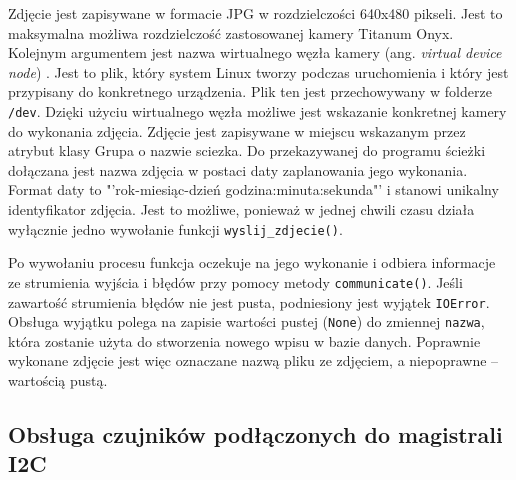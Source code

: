\documentclass[a4paper,11pt,twoside]{article}
\begin{document}
Zdjęcie jest zapisywane w formacie JPG w rozdzielczości 640x480 pikseli. Jest to maksymalna możliwa rozdzielczość zastosowanej kamery Titanum Onyx. Kolejnym argumentem jest nazwa wirtualnego węzła kamery (ang. \textit{virtual device node}) \cite{dev_video}. Jest to plik, który system Linux tworzy podczas uruchomienia i który jest przypisany do konkretnego urządzenia. Plik ten jest przechowywany w folderze \texttt{/dev}. Dzięki użyciu wirtualnego węzła możliwe jest wskazanie konkretnej kamery do wykonania zdjęcia. Zdjęcie jest zapisywane w miejscu wskazanym przez atrybut klasy Grupa o nazwie sciezka. Do przekazywanej do programu ścieżki dołączana jest nazwa zdjęcia w postaci daty zaplanowania jego wykonania. Format daty to "'rok-miesiąc-dzień godzina:minuta:sekunda"' i stanowi unikalny identyfikator zdjęcia. Jest to możliwe, ponieważ w jednej chwili czasu działa wyłącznie jedno wywołanie funkcji \texttt{wyslij{\_}zdjecie()}.

Po wywołaniu procesu funkcja oczekuje na jego wykonanie i odbiera informacje ze strumienia wyjścia i błędów przy pomocy metody \texttt{communicate()}. Jeśli zawartość strumienia błędów nie jest pusta, podniesiony jest wyjątek \texttt{IOError}. Obsługa wyjątku polega na zapisie wartości pustej (\texttt{None}) do zmiennej \texttt{nazwa}, która zostanie użyta do stworzenia nowego wpisu w bazie danych. Poprawnie wykonane zdjęcie jest więc oznaczane nazwą pliku ze zdjęciem, a niepoprawne -- wartością pustą.
\subsection{Obsługa czujników podłączonych do magistrali I2C}
\end{document}
